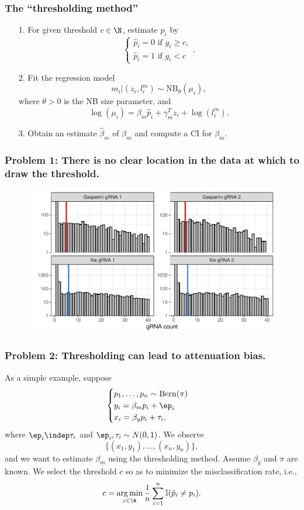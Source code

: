 \documentclass{beamer}
\DeclareMathOperator*{\argmin}{arg\,min}
\begin{document}
\begin{frame}
\frametitle{The ``thresholding method''}

\begin{itemize}
\item[1.] For given threshold $c \in \N$, estimate $p_i$ by $$ \begin{cases} \hat{p}_i = 0 \textrm{ if } g_i \geq c, \\ \hat{p}_i = 1 \textrm{ if } g_i < c \end{cases}.$$
\item[2.] Fit the regression model \cite{Sarkar2021}
$$ m_i | \left( z_i, l^m_i \right) \sim \textrm{NB}_\theta(\mu_i),$$ where $\theta >0$ is the NB size parameter, and $$\log\left(\mu_i\right) = \beta_m \hat{p}_i + \gamma^T_m z_i + \log\left( l_i^m\right).$$
\item[3.] Obtain an estimate $\hat{\beta}_m$ of $\beta_m$ and compute a CI for $\beta_m$.
\end{itemize}
\end{frame}

\begin{frame}
\frametitle{Problem 1: There is no clear location in the data at which to draw the threshold.}
\begin{figure}
	\centering
	\includegraphics[width=1\linewidth]{../figures/fig2/histograms}
\end{figure}


\end{frame}


\begin{frame}
\frametitle{Problem 2: Thresholding can lead to attenuation bias.}


As a simple example, suppose
$$
\begin{cases}
p_1, \dots, p_n \sim \textrm{Bern}(\pi) \\
y_i = \beta_m p_i + \ep_i \\
x_i = \beta_g p_i + \tau_i,
\end{cases}
$$
where $\ep_i \indep \tau_i$ and $\ep_i, \tau_i \sim N(0,1)$. We observe
$$ \{(x_1, y_1), \dots, (x_n, y_n)\},$$ and we want to estimate $\beta_m$ using the thresholding method. Assume $\beta_g$ and $\pi$ are known. We select the threshold $c$ so as to minimize the misclassification rate, i.e., $$c = \argmin_{c \in \R} \frac{1}{n} \sum_{i=1}^n \mathbb{I}(\hat{p}_i \neq p_i).$$

\end{frame}
\end{document}
